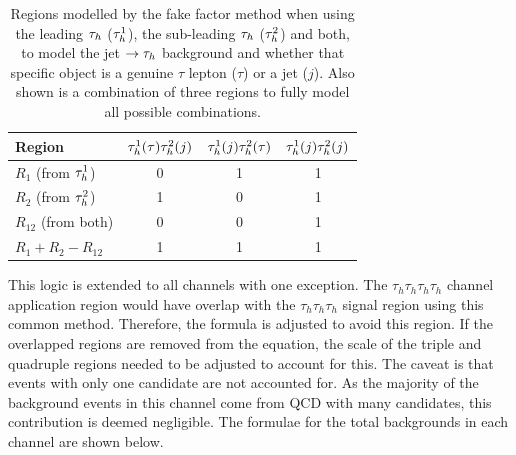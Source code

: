 \begin{table}[H]
\centering
\begin{tabular}{|l|ccc|}
\hline
Region    & $\tau_{h}^1 (\tau) \tau_{h}^2 (j)$ & $\tau_{h}^1 (j) \tau_{h}^2 (\tau)$ & $\tau_{h}^1 (j) \tau_{h}^2 (j)$ \\
\hline
\hline
$R_{1}$ (from $\tau_{h}^1$)     & 0                            & 1                            & 1                         \\
$R_{2}$ (from $\tau_{h}^2$)     & 1                            & 0                            & 1                         \\
$R_{12}$ (from both)         & 0                            & 0                            & 1                         \\
\hline
$R_{1} +R_{2} - R_{12}$      & 1                            & 1                            & 1       \\                  
\hline
\end{tabular}
\caption[Regions modelled by the fake factor method using different $\tauh$ objects.]{Regions modelled by the fake factor method when using the leading $\tauh$ ($\tau_{h}^1$), the sub-leading $\tauh$ ($\tau_{h}^2$) and both, to model the jet $\rightarrow \tau_{h}$ background and whether that specific object is a genuine $\tau$ lepton ($\tau$) or a jet ($j$). Also shown is a combination of three regions to fully model all possible combinations. }
\label{tab:apply_ff}
\end{table}

This logic is extended to all channels with one exception.
The $\tau_h \tau_h \tau_h \tau_h$ channel application region would have overlap with the $\tau_h \tau_h \tau_h$ signal region using this common method. 
Therefore, the formula is adjusted to avoid this region.
If the overlapped regions are removed from the equation, the scale of the triple and quadruple regions needed to be adjusted to account for this.
The caveat is that events with only one \jtth candidate are not accounted for.
As the majority of the background events in this channel come from \ac{QCD} with many \jtth candidates, this contribution is deemed negligible.
The formulae for the total \jtth backgrounds in each channel are shown below. \\

